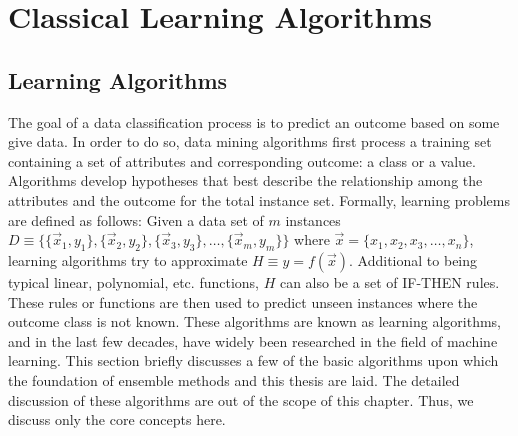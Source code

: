 \chapter{Classical Learning Algorithms}
\label{appndx:cla}

\section*{Learning Algorithms}
The goal of a data classification process is to predict an outcome based on some give data. In order to do so, data mining algorithms first process a training set containing a set of attributes and corresponding outcome: a class or a value. Algorithms develop hypotheses that best describe the relationship among the attributes and the outcome for the total instance set.  Formally, learning problems are defined as follows: Given a data set of $m$ instances  $D \equiv \{ \{\vec{x}_1, y_1\}, \{\vec{x}_2, y_2\}, \{\vec{x}_3, y_3\}, \dots, \{\vec{x}_m, y_m\} \}$ where $ \vec{x} = \{x_1, x_2, x_3, \dots, x_n\}$, learning algorithms try to approximate $H \equiv y = f(\vec{x})$. Additional to being typical linear, polynomial, etc. functions, $H$ can also be a set of IF-THEN rules. These rules or functions are then used to predict unseen instances where the outcome class is not known. These algorithms are known as learning algorithms, and in the last few decades, have widely been researched in the field of machine learning. This section briefly discusses a few of the basic algorithms upon which the foundation of ensemble methods and this thesis are laid. The detailed discussion of these algorithms are out of the scope of this chapter. Thus, we discuss only the core concepts here.

